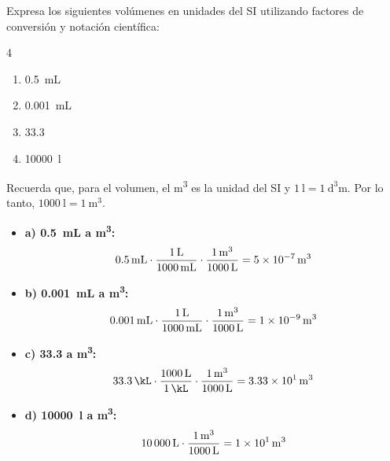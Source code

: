 \begin{exercise}
\end{exercise}

\begin{exercise}
    Expresa los siguientes volúmenes en unidades del SI utilizando factores de conversión y notación científica:
    \begin{multicols}{4}
        \begin{enumerate}[label=\letraminuscula]
\item \qty{0.5}{\mL}
\item \qty{0.001}{\mL}
\item \qty{33.3}{\kL}
\item \qty{10000}{\litre}
        \end{enumerate}
    \end{multicols}


    \begin{solu}
        Recuerda que, para el volumen, el \unit{\cubic\metre} es la unidad del SI y \( \qty{1}{\litre} = \qty{1}{\cubic\deci\metre} \). Por lo tanto, \( \qty{1000}{\litre} = \qty{1}{\cubic\metre} \).
        \begin{itemize}
            \item \textbf{a) \qty{0.5}{\mL} a \unit{\cubic\metre}:}
            \[ \qty{0.5}{\cancel{\mL}} \cdot \frac{\qty{1}{\cancel{\litre}}}{\qty{1000}{\cancel{\mL}}} \cdot \frac{\qty{1}{\cubic\metre}}{\qty{1000}{\cancel{\litre}}} = \qty{5e-7}{\cubic\metre} \]
            \item \textbf{b) \qty{0.001}{\mL} a \unit{\cubic\metre}:}
            \[ \qty{0.001}{\cancel{\mL}} \cdot \frac{\qty{1}{\cancel{\litre}}}{\qty{1000}{\cancel{\mL}}} \cdot \frac{\qty{1}{\cubic\metre}}{\qty{1000}{\cancel{\litre}}} = \qty{1e-9}{\cubic\metre} \]
            \item \textbf{c) \qty{33.3}{\kL} a \unit{\cubic\metre}:}
            \[ \qty{33.3}{\cancel{\kL}} \cdot \frac{\qty{1000}{\cancel{\litre}}}{\qty{1}{\cancel{\kL}}} \cdot \frac{\qty{1}{\cubic\metre}}{\qty{1000}{\cancel{\litre}}} = \qty{3.33e1}{\cubic\metre} \]
            \item \textbf{d) \qty{10000}{\litre} a \unit{\cubic\metre}:}
            \[ \qty{10000}{\cancel{\litre}} \cdot \frac{\qty{1}{\cubic\metre}}{\qty{1000}{\cancel{\litre}}} = \qty{1e1}{\cubic\metre} \]
        \end{itemize}
    \end{solu}

\end{exercise}

